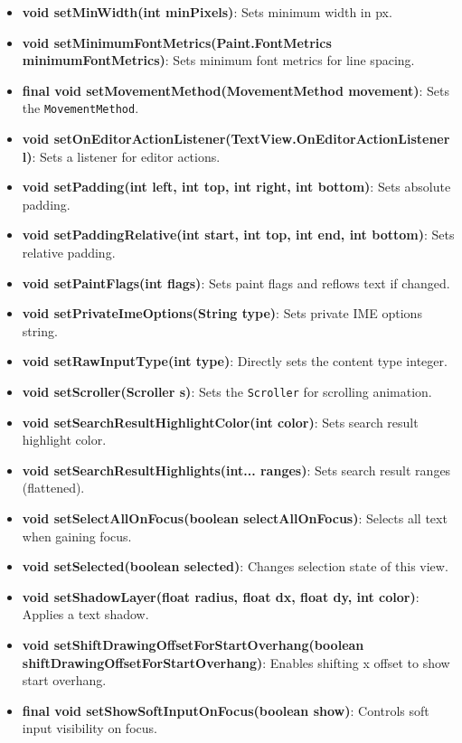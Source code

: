 \documentclass{report}
\begin{document}
\begin{itemize}
\begin{itemize}
                \item \textbf{void setMinWidth(int minPixels)}: Sets minimum width in px.
                \item \textbf{void setMinimumFontMetrics(Paint.FontMetrics minimumFontMetrics)}: Sets minimum font metrics for line spacing.
                \item \textbf{final void setMovementMethod(MovementMethod movement)}: Sets the \texttt{MovementMethod}.
                \item \textbf{void setOnEditorActionListener(TextView.OnEditorActionListener l)}: Sets a listener for editor actions.
                \item \textbf{void setPadding(int left, int top, int right, int bottom)}: Sets absolute padding.
                \item \textbf{void setPaddingRelative(int start, int top, int end, int bottom)}: Sets relative padding.
                \item \textbf{void setPaintFlags(int flags)}: Sets paint flags and reflows text if changed.
                \item \textbf{void setPrivateImeOptions(String type)}: Sets private IME options string.
                \item \textbf{void setRawInputType(int type)}: Directly sets the content type integer.
                \item \textbf{void setScroller(Scroller s)}: Sets the \texttt{Scroller} for scrolling animation.
                \item \textbf{void setSearchResultHighlightColor(int color)}: Sets search result highlight color.
                \item \textbf{void setSearchResultHighlights(int... ranges)}: Sets search result ranges (flattened).
                \item \textbf{void setSelectAllOnFocus(boolean selectAllOnFocus)}: Selects all text when gaining focus.
                \item \textbf{void setSelected(boolean selected)}: Changes selection state of this view.
                \item \textbf{void setShadowLayer(float radius, float dx, float dy, int color)}: Applies a text shadow.
                \item \textbf{void setShiftDrawingOffsetForStartOverhang(boolean shiftDrawingOffsetForStartOverhang)}: Enables shifting x offset to show start overhang.
                \item \textbf{final void setShowSoftInputOnFocus(boolean show)}: Controls soft input visibility on focus.

\end{itemize}
\end{itemize}
\end{document}
